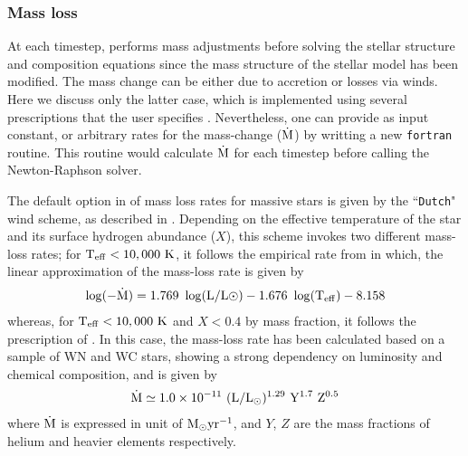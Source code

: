 \documentclass[../../main/thesis_msc.tex]{subfiles}
\begin{document}
				\subsubsection{Mass loss} \label{sec2:mass_loss}
					At each timestep, \mesa performs mass adjustments before solving the stellar structure and composition equations since the mass structure of the stellar model has been modified. The mass change can be either due to accretion or losses via winds. Here we discuss only the latter case, which is implemented using several prescriptions that the user specifies \citep[e.g.][]{Dutch, deJager1988}. Nevertheless, one can provide as input constant, or arbitrary rates for the mass-change ($\rm \dot{M}$) by writting a new \texttt{fortran} routine. This routine would calculate $\rm \dot{M}$ for each timestep before calling the Newton-Raphson solver.
					
					  The default option in \mesa of mass loss rates for massive stars is given by the ``\texttt{Dutch}" wind scheme, as described in \cite{Dutch}. Depending on the effective temperature of the star and its surface hydrogen abundance ($X$), this scheme invokes two different mass-loss rates; for $\rm T_{eff} < 10,000 \ K$, it follows the empirical rate from \cite{deJager1988} in which, the linear approximation of the mass-loss rate is given by
					  \begin{align}
					  	\rm \log(- \dot{M}) = 1.769 \ \log(L/L{\odot}) - 1.676 \ \log(T_{eff}) - 8.158
					  \end{align}
					  whereas, for $\rm T_{eff} < 10,000 \ K$ and $X < 0.4$ by mass fraction, it follows the prescription of \cite{Nugis2000}. In this case, the mass-loss rate has been calculated based on a sample of WN and WC stars, showing a strong dependency on luminosity and chemical composition, and is given by 
					  \begin{align}
					  	\rm \dot{M} \simeq 1.0 \times 10^{-11} \ (L/L_{\odot})^{1.29} \ Y^{1.7} \ Z^{0.5}
					  \end{align}
					where $\rm \dot{M}$ is expressed in unit of $\rm M_{\odot} yr^{-1}$, and $Y$, $Z$ are the mass fractions of helium and heavier elements respectively.
					
					
\end{document}
